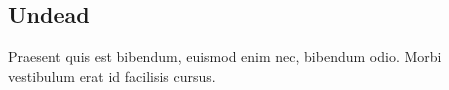 \subsection{Undead}

\begin{quotebox}
Praesent quis est bibendum, euismod enim nec, bibendum odio. Morbi vestibulum erat id facilisis cursus.
\end{quotebox}

